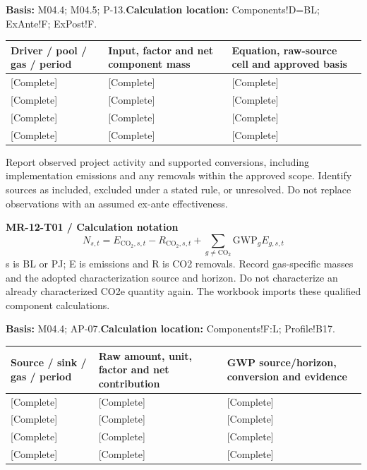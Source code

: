 \textbf{Basis:} M04.4; M04.5; P-13.\quad\textbf{Calculation location:} Components!D=BL; ExAnte!F; ExPost!F.\par\endgroup
{\sffamily\fontsize{8.6}{10.7}\selectfont\begin{longtable}{@{}P{48mm}P{61mm}P{53mm}@{}}
\toprule
\textbf{Driver / pool / gas / period} & \textbf{Input, factor and net component mass} & \textbf{Equation, raw-source cell and approved basis}\\\midrule\endhead
\rule{0pt}{8mm}[Complete] & [Complete] & [Complete]\\\hline
\rule{0pt}{8mm}[Complete] & [Complete] & [Complete]\\\hline
\rule{0pt}{8mm}[Complete] & [Complete] & [Complete]\\\hline
\rule{0pt}{8mm}[Complete] & [Complete] & [Complete]\\\hline
\end{longtable}}
Report observed project activity and supported conversions, including implementation emissions and any removals within the approved scope. Identify sources as included, excluded under a stated rule, or unresolved. Do not replace observations with an assumed ex-ante effectiveness.\par
{}
\par\begingroup\sffamily\fontsize{8.4}{10.5}\selectfont\color{NEBGreen}
\textbf{MR-12-T01 / Calculation notation}\
{\fontsize{10}{12}\selectfont\[N_{s,t}=E_{\mathrm{CO_2},s,t}-R_{\mathrm{CO_2},s,t}+\sum_{g\ne\mathrm{CO_2}}\mathrm{GWP}_gE_{g,s,t}\]}
s is BL or PJ; E is emissions and R is CO2 removals. Record gas-specific masses and the adopted characterization source and horizon. Do not characterize an already characterized CO2e quantity again. The workbook imports these qualified component calculations.\par
\textbf{Basis:} M04.4; AP-07.\quad\textbf{Calculation location:} Components!F:L; Profile!B17.\par\endgroup
{\sffamily\fontsize{8.6}{10.7}\selectfont\begin{longtable}{@{}P{48mm}P{61mm}P{53mm}@{}}
\toprule
\textbf{Source / sink / gas / period} & \textbf{Raw amount, unit, factor and net contribution} & \textbf{GWP source/horizon, conversion and evidence}\\\midrule\endhead
\rule{0pt}{8mm}[Complete] & [Complete] & [Complete]\\\hline
\rule{0pt}{8mm}[Complete] & [Complete] & [Complete]\\\hline
\rule{0pt}{8mm}[Complete] & [Complete] & [Complete]\\\hline
\rule{0pt}{8mm}[Complete] & [Complete] & [Complete]\\\hline
\end{longtable}}
